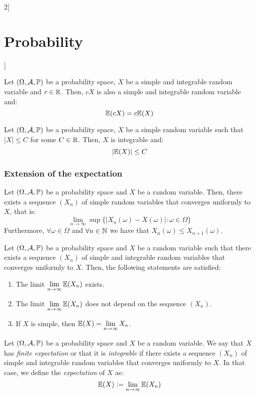 \documentclass[../../../main.tex]{subfiles}
\begin{document}
\begin{multicols}{2}[\section{Probability}]
\begin{prop}
    \end{prop}
    \begin{prop}
        Let $(\Omega,\mathcal{A},\mathbb{P})$ be a probability space, $X$ be a simple and integrable random variable and $c\in\mathbb{R}$. Then, $cX$ is also a simple and integrable random variable and: $$\mathbb{E}(cX)=c\mathbb{E}(X)$$
    \end{prop}
    \begin{prop}
        Let $(\Omega,\mathcal{A},\mathbb{P})$ be a probability space, $X$ be a simple random variable such that $|X|\leq C$ for some $C\in\mathbb{R}$. Then, $X$ is integrable and: $$|\mathbb{E}(X)|\leq C$$
    \end{prop}
    \subsubsection{Extension of the expectation}
    \begin{prop}
        Let $(\Omega,\mathcal{A},\mathbb{P})$ be a probability space and $X$ be a random variable. Then, there exists a sequence $(X_n)$ of simple random variables that converges uniformly to $X$, that is: $$\lim_{n\to\infty}\sup\{|X_n(\omega)-X(\omega)|:\omega\in\Omega\}$$ Furthermore, $\forall\omega\in\Omega$ and $\forall n\in\mathbb{N}$ we have that $X_n(\omega)\leq X_{n+1}(\omega)$.
    \end{prop}
    \begin{theorem}
        Let $(\Omega,\mathcal{A},\mathbb{P})$ be a probability space and $X$ be a random variable such that there exists a sequence $(X_n)$ of simple and integrable random variables that converges uniformly to $X$. Then, the following statements are satisfied:
        \begin{enumerate}
            \item The limit $\displaystyle\lim_{n\to\infty}\mathbb{E}(X_n)$ exists.
            \item The limit $\displaystyle\lim_{n\to\infty}\mathbb{E}(X_n)$ does not depend on the sequence $(X_n)$.
            \item If $X$ is simple, then $\displaystyle\mathbb{E}(X)=\lim_{n\to\infty}X_n$.
        \end{enumerate}
    \end{theorem}
    \begin{definition}[Expectation]
        Let $(\Omega,\mathcal{A},\mathbb{P})$ be a probability space and $X$ be a random variable. We say that $X$ has \textit{finite expectation} or that it is \textit{integrable} if there exists a sequence $(X_n)$ of simple and integrable random variables that converges uniformly to $X$. In that case, we define the \textit{expectation} of $X$ as: $$\mathbb{E}(X):=\lim_{n\to\infty}\mathbb{E}(X_n)$$

\end{definition}
\end{multicols}
\end{document}
